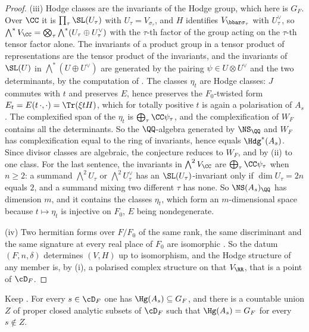 \begin{proof}
(iii) Hodge classes are the invariants of the Hodge group, which here is
$G_{F}$. Over $\CC$ it is $\prod_{\tau}\SL(U_{\tau})$ with
$U_{\tau}=V_{\sigma_{\tau}}$, and
$H$ identifies $V_{\bbar\sigma_{\tau}}$ with $U_{\tau}^{\vee}$, so
$\bigwedge^{*}V_{\CC}=\bigotimes_{\tau}\bigwedge^{*}(U_{\tau}\oplus U_{\tau}^{\vee})$
with the $\tau$-th factor of the group acting on the $\tau$-th tensor factor
alone. The invariants of a product group in a tensor product of
representations are the tensor product of the invariants, and the invariants
of $\SL(U)$ in $\bigwedge^{*}(U\oplus U^{\vee})$ are generated by the pairing
$\psi\in U\otimes U^{\vee}$ and the two determinants, by the computation of
. The classes $\eta_{t}$ are Hodge classes: $J$ commutes
with $t$ and preserves $E$, hence preserves the $F_{0}$-twisted form
$E_{t}=E(t\,\cdot,\cdot)=\Tr(\xi tH)$, which for totally positive $t$ is again
a polarisation of $A_{s}$. The complexified span of the $\eta_{t}$ is
$\bigoplus_{\tau}\CC\psi_{\tau}$, and the complexification of $W_{F}$
contains all the determinants. So the $\QQ$-algebra generated by $\NS_{\QQ}$
and $W_{F}$ has complexification equal to the ring of invariants, hence
equals $\Hdg^{*}(A_{s})$. Since divisor classes are algebraic, the conjecture
reduces to $W_{F}$, and by (ii) to one class. For the last sentence, the
invariants in $\bigwedge^{2}V_{\CC}$ are $\bigoplus_{\tau}\CC\psi_{\tau}$ when
$n\ge2$: a summand $\bigwedge^{2}U_{\tau}$ or $\bigwedge^{2}U_{\tau}^{\vee}$
has an $\SL(U_{\tau})$-invariant only if $\dim U_{\tau}=2n$ equals $2$, and a
summand mixing two different $\tau$ has none. So $\NS(A_{s})_{\QQ}$ has
dimension $m$, and it contains the classes $\eta_{t}$, which form an
$m$-dimensional space because $t\mapsto\eta_{t}$ is injective on $F_{0}$, $E$
being nondegenerate.

(iv) Two hermitian forms over $F/F_{0}$ of the same rank, the same
discriminant and the same signature at every real place of $F_{0}$ are
isomorphic \cite[Ch.~10, \S6]{Sch85}. So the datum $(F,n,\delta)$ determines
$(V,H)$ up to isomorphism, and the Hodge structure of any member is, by (i), a
polarised complex structure on that $V_{\RR}$, that is a point of $\cD_{F}$.
\end{proof}

\begin{lemma}\label{lem:cmgeneric}
Keep . For every $s\in\cD_{F}$ one has
$\Hg(A_{s})\subseteq G_{F}$, and there is a countable union $Z$ of proper
closed analytic subsets of $\cD_{F}$ such that $\Hg(A_{s})=G_{F}$ for every
$s\notin Z$.
\end{lemma}

